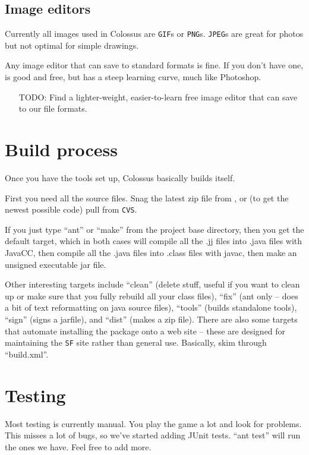 \documentclass{article}
\begin{document}
\subsection{Image editors}

Currently all images used in Colossus are \texttt{GIF}s or \texttt{PNG}s.
\texttt{JPEG}s are great for photos but not optimal for simple drawings.

Any image editor that can save to standard formats is fine. If you
don't have one,  is good and free,
but has a steep learning curve, much like Photoshop. 
\begin{itemize}
\item[TODO:] Find a lighter-weight, easier-to-learn free image editor that 
can save to our file formats.
\end{itemize}

\section{Build process}

Once you have the tools set up, Colossus basically builds itself.

First you need all the source files. Snag the latest zip file from 
,
or (to get the newest possible code) pull from \texttt{CVS}.

If you just type ``ant'' or ``make'' from the project base directory,
then you get the default target, which in both cases will compile
all the .jj files into .java files with JavaCC, then compile all
the .java files into .class files with javac, then make an unsigned
executable jar file.

Other interesting targets include ``clean'' (delete stuff, useful if
you want to clean up or make sure that you fully rebuild all your
class files), ``fix'' (ant only -- does a bit of text reformatting on
java source files), ``tools'' (builds standalone tools), ``sign'' (signs
a jarfile), and ``dist'' (makes a zip file). There are also some
targets that automate installing the package onto a web site --
these are designed for maintaining the \texttt{SF} site rather than general
use. Basically, skim through ``build.xml''.

\section{Testing}

Most testing is currently manual.  You play the game a lot and look for 
problems.  This misses a lot of bugs, so we've started adding JUnit tests.
``ant test'' will run the ones we have.  Feel free to add more.



\end{document}
